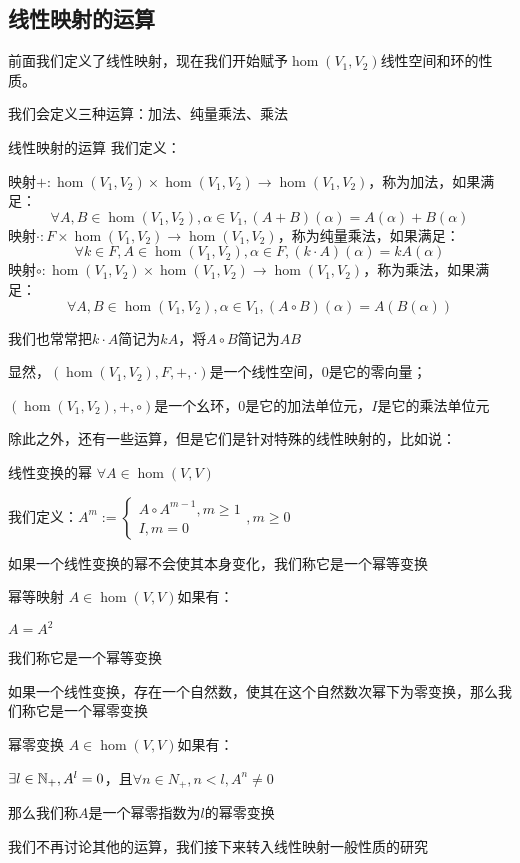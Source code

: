 \documentclass[12pt, a4paper, oneside, UTF8]{ctexbook}
\begin{document}
		\subsection{线性映射的运算}
			前面我们定义了线性映射，现在我们开始赋予$\hom (V_1,V_2)$线性空间和环的性质。

			我们会定义三种运算：加法、纯量乘法、乘法
			\begin{defn}{线性映射的运算}{}
				我们定义：
				
				映射$+:\hom(V_1,V_2) \times \hom(V_1,V_2) \rightarrow \hom(V_1,V_2)$，称为加法，如果满足：
				\begin{equation}
					\forall A,B \in \hom(V_1,V_2),\alpha \in V_1,(A+B)(\alpha )=A(\alpha )+B(\alpha )
				\end{equation}
				映射$\cdot:F \times \hom(V_1,V_2) \rightarrow \hom(V_1,V_2)$，称为纯量乘法，如果满足：
				\begin{equation}
					\forall k \in F,A \in \hom(V_1,V_2),\alpha \in F,(k\cdot A)(\alpha )=kA(\alpha )
				\end{equation}
				映射$\circ:\hom(V_1,V_2) \times \hom(V_1,V_2) \rightarrow \hom(V_1,V_2)$，称为乘法，如果满足：
				\begin{equation}
					\forall A,B \in \hom(V_1,V_2),\alpha \in V_1,(A\circ B)(\alpha )=A\left(B(\alpha )\right)
				\end{equation}
			\end{defn}
			我们也常常把$k\cdot A$简记为$kA$，将$A \circ B$简记为$AB$

			显然，$\left(\hom(V_1,V_2),F,+,\cdot\right)$是一个线性空间，$0$是它的零向量；

			$\left(\hom(V_1,V_2),+,\circ\right)$是一个幺环，$0$是它的加法单位元，$I$是它的乘法单位元

			除此之外，还有一些运算，但是它们是针对特殊的线性映射的，比如说：
			\begin{defn}{线性变换的幂}{}
				$\forall A \in \hom(V,V)$

				我们定义：$A^m:= \begin{cases}
					A\circ A^{m-1},m \geqslant 1 \\
					I,m = 0
				\end{cases},m \geqslant 0$
			\end{defn}
			如果一个线性变换的幂不会使其本身变化，我们称它是一个幂等变换
			\begin{defn}{幂等映射}{}
				$A \in \hom(V,V)$如果有：

				$A = A^2$

				我们称它是一个幂等变换
			\end{defn}
			如果一个线性变换，存在一个自然数，使其在这个自然数次幂下为零变换，那么我们称它是一个幂零变换
			\begin{defn}{幂零变换}{}
				$A \in \hom(V,V)$如果有：

				$\exists l \in \mathbb{N}_+,A^l = 0$，且$\forall n \in N_+ ,n < l,A^n \neq 0$

				那么我们称$A$是一个幂零指数为$l$的幂零变换
			\end{defn}
			我们不再讨论其他的运算，我们接下来转入线性映射一般性质的研究
\end{document}
